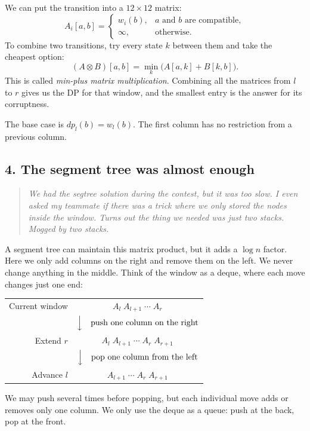 \documentclass[11pt,a4paper]{article}
\begin{document}
We can put the transition into a $12\times12$ matrix:
\[
  A_i[a,b]=\begin{cases}
    w_i(b),&a\text{ and }b\text{ are compatible},\\
    \infty,&\text{otherwise}.
  \end{cases}
\]
To combine two transitions, try every state $k$ between them and take
the cheapest option:
\[
  (A\otimes B)[a,b]=\min_k\bigl(A[a,k]+B[k,b]\bigr).
\]
This is called \emph{min-plus matrix multiplication}. Combining all the
matrices from $l$ to $r$ gives us the DP for that window, and the smallest
entry is the answer for its corruptness.

The base case is $dp_l(b)=w_l(b)$. The first column has no restriction
from a previous column.

\subsection*{4. The segment tree was almost enough}

\begin{quote}
\small\itshape
We had the segtree solution during the contest, but it was too slow.
I even asked my teammate if there was a trick where we only stored
the nodes inside the window. Turns out the thing we needed was just
two stacks. Mogged by two stacks.
\end{quote}

A segment tree can maintain this matrix product, but it adds a
$\log n$ factor. Here we only add columns on the right and remove them
on the left. We never change anything in the middle. Think of the
window as a deque, where each move changes just one end:

\begin{center}
\renewcommand{\arraystretch}{1.7}
\begin{tabular}{rc}
Current window &
  $\boxed{A_l}\;\boxed{A_{l+1}}\;\boxed{\cdots}\;\boxed{A_r}$ \\
& $\Big\downarrow\quad\text{push one column on the right}$ \\
Extend $r$ &
  $\boxed{A_l}\;\boxed{A_{l+1}}\;\boxed{\cdots}\;\boxed{A_r}\;\boxed{A_{r+1}}$ \\
& $\Big\downarrow\quad\text{pop one column from the left}$ \\
Advance $l$ &
  $\boxed{A_{l+1}}\;\boxed{\cdots}\;\boxed{A_r}\;\boxed{A_{r+1}}$
\end{tabular}
\end{center}
We may push several times before popping, but each individual move
adds or removes only one column. We only use the deque as a queue:
push at the back, pop at the front.
\end{document}
